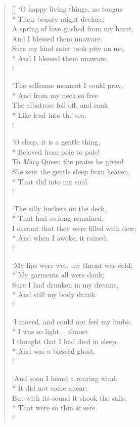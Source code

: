 \documentclass[MAIN]{subfiles}
\begin{document}
\begin{verse}[\versewidth]
`O happy living things, no tongue\\*
\vin Their beauty might declare:\\
A spring of love gushed from my heart,\\
\vin And I blessed them unaware:\\
Sure my kind saint took pity on me,\\*
\vin And I blessed them unaware.\\!

`The selfsame moment I could pray;\\*
\vin And from my neck so free\\
The albatross fell off, and sank\\* 
\vin Like lead into the sea.\\!

`O sleep, it is a gentle thing,\\*
\vin Beloved from pole to pole!\\
To \emph{Mary} Queen the praise be given!\\
She sent the gentle sleep from heaven,\\*
\vin That slid into my soul.\\!

`The silly buckets on the deck,\\*
\vin That had so long remained,\\
I dreamt that they were filled with dew;\\*
\vin And when I awoke, it rained.\\!

`My lips were wet; my throat was cold;\\*
\vin My garments all were dank;\\
Sure I had drunken in my dreams,\\*
\vin And still my body drank.\\!

`I moved, and could not feel my limbs:\\*
\vin I was so light -- almost\\
I thought that I had died in sleep,\\*
\vin And was a bless\`ed ghost.\\!

`And soon I heard a roaring wind:\\*
\vin It did not come anear;\\
But with its sound it shook the sails,\\*
\vin That were so thin \& sere.\\!


\end{verse}
\end{document}
